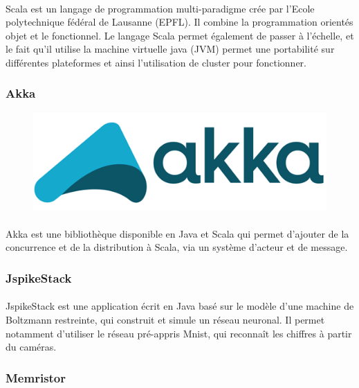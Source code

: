 \documentclass[a4paper,10pt]{article}
\begin{document}
\paragraph{}
Scala est un langage de programmation multi-paradigme crée par l’Ecole polytechnique fédéral de Lausanne (EPFL). Il combine la programmation orientés objet et le fonctionnel. Le langage Scala permet également de passer à l’échelle, et le fait qu’il utilise la machine virtuelle java (JVM) permet une portabilité sur différentes plateformes et ainsi l’utilisation de cluster pour fonctionner.

\subsubsection{Akka} 
\begin{figure}[h!]
\includegraphics[scale=0.1,right]{image/akka.png}
\end{figure}
\paragraph{}
Akka est une bibliothèque disponible en Java et Scala qui permet d’ajouter de la concurrence et de la distribution à Scala, via un système d'acteur et de message.
        
\subsubsection{JspikeStack} 

\paragraph{}
JspikeStack est une application écrit en Java basé sur le modèle d'une machine de Boltzmann restreinte, qui construit et simule un réseau neuronal. Il permet notamment d’utiliser le réseau pré-appris Mnist, qui reconnaît les chiffres à partir du caméras.

\subsubsection{Memristor} 
\end{document}
